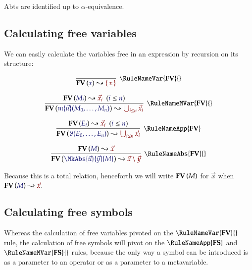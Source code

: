Abts are identified up to $\alpha$-equivalence.

\subsection{Calculating free variables}

\newcommand\RuleFVVar{\RuleNameVar{\mathbf{FV}}{}}
\newcommand\RuleFVMVar{\RuleNameMVar{\mathbf{FV}}{}}
\newcommand\RuleFVApp{\RuleNameApp{\mathbf{FV}}}
\newcommand\RuleFVAbs{\RuleNameAbs{\mathbf{FV}}{}}

We can easily calculate the variables free in an expression by recursion on its
structure:

\begin{gather*}
  \infer[\RuleFVVar]{
    \CalcFV{x}{\MkSet{x}}
  }{
  }\\[6pt]
  \infer[\RuleFVMVar]{
    \CalcFV{
      \MApp{\MV{m}}{\vec{u}}{M_0,\dots,M_n}
    }{
      \bigcup_{i\leq n} \vec{x}_i
    }
  }{
    \HypJ{
      \CalcFV{M_i}{\vec{x}_i}
    }{
      \Leq{i}{n}
    }
  }\\[6pt]
  \infer[\RuleFVApp]{
    \CalcFV{
      \App{\vartheta}{E_0,\dots,E_n}
    }{
      \bigcup_{i\leq n} \vec{x}_i
    }
  }{
    \HypJ{
      \CalcFV{E_i}{\vec{x}_i}
    }{
      \Leq{i}{n}
    }
  }\\[6pt]
  \infer[\RuleFVAbs]{
    \CalcFV{
      \MkAbs{\vec{u}}{\vec{y}}{M}
    }{
      \vec{x}\setminus\vec{y}
    }
  }{
    \CalcFV{M}{\vec{x}}
  }
\end{gather*}

Because this is a total relation, henceforth we will write $\mathbf{FV}\left(M\right)$ for
$\vec{x}$ when $\CalcFV{M}{\vec{x}}$.

\subsection{Calculating free symbols}

\newcommand\RuleFSVar{\RuleNameVar{\mathbf{FS}}{}}
\newcommand\RuleFSMVar{\RuleNameMVar{\mathbf{FS}}{}}
\newcommand\RuleFSApp{\RuleNameApp{\mathbf{FS}}}
\newcommand\RuleFSAbs{\RuleNameAbs{\mathbf{FS}}{}}

Whereas the calculation of free variables pivoted on the $\RuleFVVar$ rule, the
calculation of free symbols will pivot on the $\RuleFSApp$ and $\RuleFSMVar$ rules,
because the only way a symbol can be introduced is as a parameter to an
operator or as a parameter to a metavariable.

